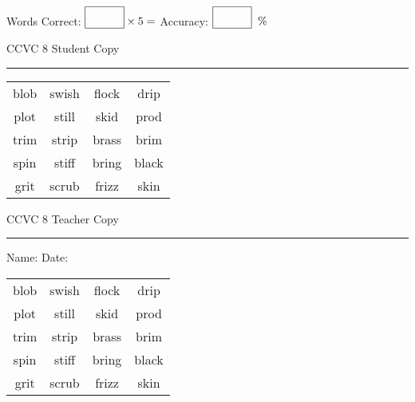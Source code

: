 \documentclass{memoir}
\begin{document}
\small

Words Correct: $\fbox{\phantom{\huge 100}} \times 5 = $ Accuracy: $\fbox{\phantom{\huge 100}}\;\; \%$ 

\vfill

\newpage


\footnotesize \noindent
CCVC 8 \hfill Student Copy
\smallskip
\hrule

\Large

\setlength{\tabcolsep}{14pt}
\def\arraystretch{3}

{\selectfont


\begin{vplace}[0.5]
\begin{center}
\begin{tabular}{cccc}
blob & swish & flock & drip \\
plot & still & skid & prod \\
trim & strip & brass       & brim      \\
spin & stiff & bring      & black            \\
grit      & scrub & frizz & skin \\
\end{tabular}
\end{center}
\end{vplace}

}

\newpage

\footnotesize \noindent
CCVC 8 \hfill Teacher Copy
\smallskip
\hrule

\small

\vfill

\noindent
Name: \underline{\hspace{1.75in}} \hfill Date: \underline{\hspace{1in}}

\Large

{\selectfont


\begin{vplace}[0.5]
\begin{center}
\begin{tabular}{cccc}
blob & swish & flock & drip \\
plot & still & skid & prod \\
trim & strip & brass       & brim      \\
spin & stiff & bring      & black            \\
grit      & scrub & frizz & skin \\
\end{tabular}
\end{center}
\end{vplace}



}
\end{document}
